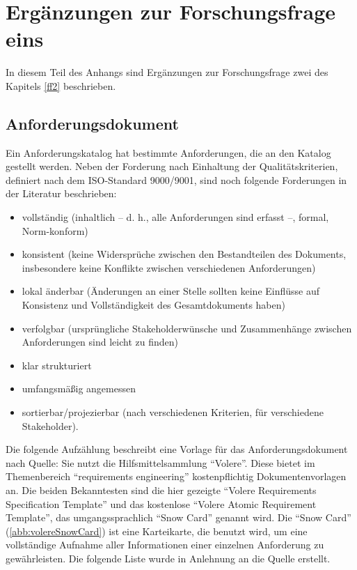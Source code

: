 \chapter{Ergänzungen zur Forschungsfrage eins} \label{appendixFF1}
In diesem Teil des Anhangs sind Ergänzungen zur Forschungsfrage zwei des Kapitels \vref{ff2} beschrieben.

\section{Anforderungsdokument}\label{appendixAnforderung}

Ein Anforderungskatalog hat bestimmte Anforderungen, die an den Katalog gestellt werden. Neben der Forderung nach Einhaltung der Qualitätskriterien, definiert nach dem ISO-Standard 9000/9001, sind noch folgende Forderungen in der Literatur beschrieben: \autocite[sig.][S.34]{partsch_requirements-engineering_2010}

\begin{itemize}
	\item vollständig (inhaltlich – d. h., alle Anforderungen sind erfasst –, formal, Norm-konform)
	\item konsistent (keine Widersprüche zwischen den Bestandteilen des Dokuments,
	insbesondere keine Konflikte zwischen verschiedenen Anforderungen)
	\item lokal änderbar (Änderungen an einer Stelle sollten keine Einflüsse auf Konsistenz und Vollständigkeit des Gesamtdokuments haben)
	\item verfolgbar (ursprüngliche Stakeholderwünsche und Zusammenhänge zwischen
	Anforderungen sind leicht zu finden)
	\item klar strukturiert
	\item umfangsmäßig angemessen
	\item sortierbar/projezierbar (nach verschiedenen Kriterien, für verschiedene Stakeholder).
\end{itemize}

Die folgende Aufzählung beschreibt eine Vorlage für das Anforderungsdokument nach Quelle: Sie nutzt die Hilfsmittelsammlung \enquote{Volere}. Diese bietet im Themenbereich \enquote{requirements engineering} kostenpflichtig Dokumentenvorlagen an. Die beiden Bekanntesten sind die hier gezeigte \enquote{Volere Requirements Specification Template} und das kostenlose \enquote{Volere Atomic Requirement Template}, das umgangssprachlich \enquote{Snow Card} genannt wird. Die \enquote{Snow Card} (\vref{abb:volereSnowCard}) ist eine Karteikarte, die benutzt wird, um eine vollständige Aufnahme aller Informationen einer einzelnen Anforderung zu gewährleisten.\autocite[vgl.][]{VolereSnowCard} Die folgende Liste wurde in Anlehnung an die Quelle \cite{VolereRequirmentsSpecTemplate} erstellt.

